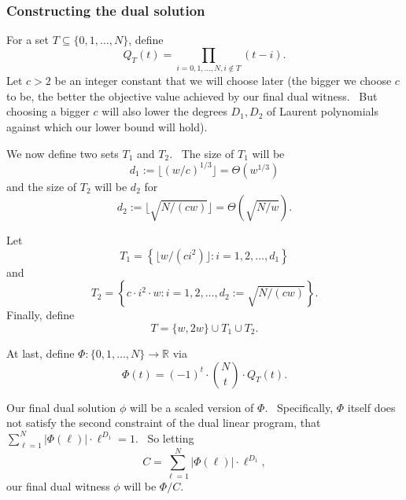 \documentclass[10pt,a4paper]{article}
\newcommand{\<}{\langle}
\renewcommand{\>}{\rangle}
\begin{document}
\subsubsection{Constructing the dual solution}
\label{duallpsec}

For a set $T\subseteq \{0,1,\dots ,N\}$, define
\begin{equation}
Q_{T}(t)=\prod_{i=0,1,\dots ,N,i\not\in T}(t-i).
\end{equation}
Let $c>2$ be an integer constant that we will choose later (the bigger we choose $c$
to be, the better the objective value achieved by our final dual witness. \
But choosing a bigger $c$ will also lower the degrees $D_{1},D_{2}$ of
Laurent polynomials against which our lower bound will hold).

We now define two sets $T_{1}$ and $T_{2}$. \ The size of $T_{1}$ will be
\begin{equation}
d_{1}:=\lfloor \left( w/c\right) ^{1/3}\rfloor =\Theta \left( w^{1/3}\right)
\end{equation}
and the size of $T_{2}$ will be $d_{2}$ for
\begin{equation}
d_{2}:=\lfloor \sqrt{N/(cw)}\rfloor =\Theta \left( \sqrt{N/w}\right) .
\end{equation}
%
%

Let
\begin{equation}
T_1 = \left\{\lfloor w/(c i^2) \rfloor \colon i=1, 2, \dots, d_1\right\}
\end{equation}
and
\begin{equation}
T_2 = \left\{c \cdot i^2 \cdot w \colon i = 1, 2, \dots, d_2:=\sqrt{N/(cw)}
\right\}.
\end{equation}
Finally, define
\begin{equation}
T = \{w, 2w\} \cup T_1 \cup T_2.
\end{equation}

At last, define $\Phi \colon \{0, 1, \dots, N\} \to \mathbb{R}$ via
\begin{equation}  \label{phidef}
\Phi(t) = (-1)^t \cdot \binom{N}{t} \cdot Q_T(t).
\end{equation}

Our final dual solution $\phi $ will be a scaled version of $\Phi $. \
Specifically, $\Phi $ itself does not satisfy the second constraint of the
dual linear program, that $\sum_{\ell =1}^{N}|\Phi (\ell )|\cdot \ell
^{D_{1}}=1$. \ So letting
\begin{equation}
C=\sum_{\ell =1}^{N}|\Phi (\ell )|\cdot \ell ^{D_{1}},  \label{Cdef}
\end{equation}
our final dual witness $\phi $ will be $\Phi /C$.
\end{document}
